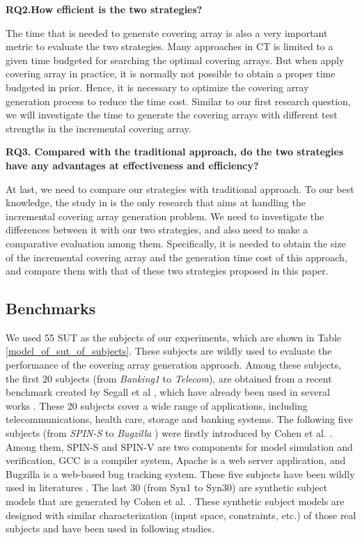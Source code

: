 \documentclass[conference]{IEEEtran}
\theoremstyle{definition}
\begin{document}
\textbf{RQ2.How efficient is the two strategies?}

The time that is needed to generate covering array is also a very important metric to evaluate the two strategies. Many approaches in CT is limited to a given time budgeted for searching the optimal covering arrays.  But when apply covering array in practice, it is normally not possible to obtain a proper time budgeted in prior. Hence, it is necessary to optimize the covering array generation process to reduce the time cost. Similar to our first research question, we will investigate the time to generate the covering arrays with different test strengths in the incremental covering array.

\textbf{RQ3. Compared with the traditional approach, do the two strategies have any advantages at effectiveness and efficiency?}

At last, we need to compare our strategies with traditional approach. To our best knowledge, the study in \cite{fouche2009incremental} is the only research that aims at handling the incremental covering array generation problem. We need to investigate the differences between it with our two strategies, and also need to make a comparative evaluation among them. Specifically, it is needed to obtain the size of the incremental covering array and the generation time cost of this approach, and compare them with that of these two strategies proposed in this paper.


\subsection{Benchmarks}
We used 55 SUT as the subjects of our experiments, which are shown in Table \ref{model_of_sut_of_subjects}. These subjects are wildly used to evaluate the performance of the covering array generation approach. Among these subjects, the first 20 subjects (from \emph{Banking1} to \emph{Telecom}), are obtained from a recent benchmark created by Segall et al \cite{segall2011using}, which have already been used in several works \cite{jia2015learning,choi2016distance}. These 20 subjects cover a wide range of applications, including telecommunications, health care, storage and banking systems.  The following five subjects (from \emph{SPIN-S}  to \emph{Bugzilla} ) were firstly introduced by Cohen et al. \cite{cohen2007interaction,cohen2008constructing}. Among them, SPIN-S and SPIN-V are two components for model simulation and verification, GCC is a compiler system, Apache is a web server application, and Bugzilla is a web-based bug tracking system. These five subjects have been wildly used in literatures \cite{kuhn2006pseudo,cohen2007interaction,cohen2008constructing,garvin2009improved,garvin2011evaluating,lin2015tca,choi2016distance}. The last 30 (from Syn1 to Syn30) are synthetic subject models that are generated by Cohen et al. \cite{cohen2008constructing}. These synthetic subject models are designed with similar characterization (input space, constraints, etc.) of those real subjects and have been used in following studies\cite{garvin2009improved,garvin2011evaluating,lin2015tca,choi2016distance}.
\end{document}
